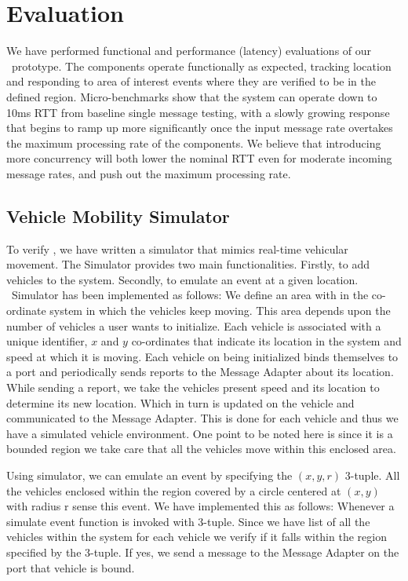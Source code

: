\section{Evaluation}

We have performed functional and performance (latency) evaluations of
our \name~prototype.  The components operate functionally as
expected, tracking location and responding to area of interest events
where they are verified to be in the defined region. Micro-benchmarks
show that the system can operate down to 10ms RTT from baseline single
message testing, with a slowly growing response that begins to ramp up
more significantly once the input message rate overtakes the maximum
processing rate of the components.  We believe that introducing more
concurrency will both lower the nominal RTT even for moderate incoming
message rates, and push out the maximum processing rate.

\subsection{Vehicle Mobility Simulator}

To verify \name, we have written a simulator that mimics real-time
vehicular movement. The Simulator provides two main
functionalities. Firstly, to add vehicles to the system. Secondly, to
emulate an event at a given location. \name~Simulator has been
implemented as follows: We define an area with in the co-ordinate
system in which the vehicles keep moving. This area depends upon the
number of vehicles a user wants to initialize. Each vehicle is
associated with a unique identifier, $x$ and $y$ co-ordinates that
indicate its location in the system and speed at which it is
moving. Each vehicle on being initialized binds themselves to a port
and periodically sends reports to the Message Adapter about its
location. While sending a report, we take the vehicles present speed
and its location to determine its new location.  Which in turn is
updated on the vehicle and communicated to the Message Adapter. This
is done for each vehicle and thus we have a simulated vehicle
environment. One point to be noted here is since it is a bounded
region we take care that all the vehicles move within this enclosed
area.

Using simulator, we can emulate an event by specifying the $(x,y,r)$
3-tuple. All the vehicles enclosed within the region covered by a
circle centered at $(x,y)$ with radius r sense this event. We have
implemented this as follows: Whenever a simulate event function is
invoked with 3-tuple. Since we have list of all the vehicles within
the system for each vehicle we verify if it falls within the region
specified by the 3-tuple. If yes, we send a message to the Message
Adapter on the port that vehicle is bound.

